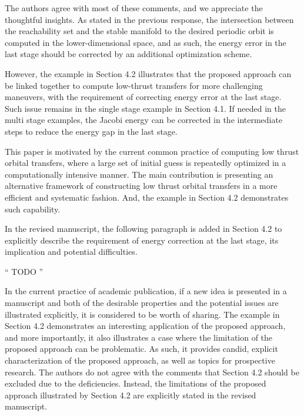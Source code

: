 \documentclass[11pt]{article}
\newenvironment{correction}{\begin{list}{}{\setlength{\leftmargin}{1cm}\setlength{\rightmargin}{1cm}}\vspace{\parsep}\item[]``}{''\end{list}}
\begin{document}
\begin{itemize}
        The authors agree with most of these comments, and we appreciate the thoughtful insights. 
        As stated in the previous response, the intersection between the reachability set and the stable manifold to the desired periodic orbit is computed in the lower-dimensional space, and as such, the energy error in the last stage should be corrected by an additional optimization scheme. 

        However, the example in Section 4.2 illustrates that the proposed approach can be linked together to compute low-thrust transfers for more challenging maneuvers, with the requirement of correcting energy error at the last stage. 
        Such issue remains in the single stage example in Section 4.1. 
        If needed in the multi stage examples, the Jacobi energy can be corrected in the intermediate steps to reduce the energy gap in the last stage. 

        This paper is motivated by the current common practice of computing low thrust orbital transfers, where a large set of initial guess is repeatedly optimized in a computationally intensive manner. 
        The main contribution is presenting an alternative framework of constructing low thrust orbital transfers in a more efficient and systematic fashion. 
        And, the example in Section 4.2 demonstrates such capability. 

        In the revised manuscript, the following paragraph is added in Section 4.2 to explicitly describe the requirement of energy correction at the last stage, its implication and potential difficulties. 

        \begin{correction}
            TODO
        \end{correction}

        In the current practice of academic publication, if a new idea is presented in a manuscript and both of the desirable properties and the potential issues are illustrated explicitly, it is considered to be worth of sharing. 
        The example in Section 4.2 demonstrates an interesting application of the proposed approach, and more importantly, it also illustrates a case where the limitation of the proposed approach can be problematic.
        As such, it provides candid, explicit characterization of the proposed approach, as well as topics for prospective research. 
        The authors do not agree with the comments that Section 4.2 should be excluded due to the deficiencies. 
        Instead, the limitations of the proposed approach illustrated by Section 4.2 are explicitly stated in the revised manuscript.


\end{itemize}
\end{document}

